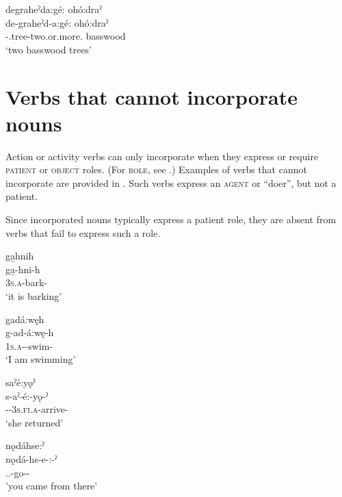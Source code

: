 \ex degraheˀda:gé: ohó:draˀ\\\label{ex:nounincex10c}
\gll de-graheˀd-a:gé: ohó:draˀ \\
 {\dualic}-.tree-two.or.more.{\stative}  basswood\\
\glt `two basswood trees'


\z
\z


\section{Verbs that cannot incorporate nouns} \label{ch:Verbs that cannot incorporate nouns}
Action or activity verbs can only incorporate when they express or require \textsc{patient} or \textsc{object} roles. (For \textsc{role}, see .) Examples of verbs that cannot incorporate are provided in . Such verbs express an  \textsc{agent} or “doer”, but not a patient. 

Since incorporated nouns typically express a patient role, they are absent from verbs that fail to express such a role.

\ea\label{ex:nounincex12}
\ea ga̱hnih\\
\gll ga̱-hni-h\\
 \textsc{3s.a}-bark-{\habitual}\\
\glt `it is barking'

\ex gadá:węh\\
\gll g-ad-á:wę-h\\
 \textsc{1s.a}-{\semireflexive}-swim-{\habitual}\\
\glt `I am swimming'

\ex saˀé:yǫˀ\\
\gll s-aˀ-é:-yǫ-ˀ\\
 {\repetitive}-{\factual}-\textsc{3s.fi.a}-arrive-{\punctual}\\
\glt `she returned'

\ex nǫdáhse:ˀ \\
\gll nǫdá-hs-e-:-ˀ\\
{\partitive.\cislocative.\factual}-go-{\purposive}-{\punctual}\\
\glt ’you came from there’

